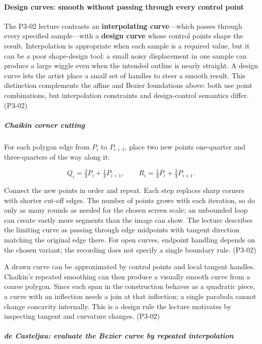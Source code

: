 \paragraph{Design curves: smooth without passing through every control point}\label{design-curves-smooth-without-passing-through-every-control-point}

The P3-02 lecture contrasts an \textbf{interpolating curve}---which passes through every specified sample---with a \textbf{design curve} whose control points shape the result. Interpolation is appropriate when each sample is a required value, but it can be a poor shape-design tool: a small noisy displacement in one sample can produce a large wiggle even when the intended outline is nearly straight. A design curve lets the artist place a small set of handles to steer a smooth result. This distinction complements the affine and Bezier foundations above: both use point combinations, but interpolation constraints and design-control semantics differ. (P3-02)

\subparagraph{Chaikin corner cutting}\label{chaikin-corner-cutting}

For each polygon edge from \(P_i\) to \(P_{i+1}\), place two new points one-quarter and three-quarters of the way along it:

\[
Q_i=\tfrac34P_i+\tfrac14P_{i+1},\qquad
R_i=\tfrac14P_i+\tfrac34P_{i+1}.
\]

Connect the new points in order and repeat. Each step replaces sharp corners with shorter cut-off edges. The number of points grows with each iteration, so do only as many rounds as needed for the chosen screen scale; an unbounded loop can create vastly more segments than the image can show. The lecture describes the limiting curve as passing through edge midpoints with tangent direction matching the original edge there. For open curves, endpoint handling depends on the chosen variant; the recording does not specify a single boundary rule. (P3-02)

A drawn curve can be approximated by control points and local tangent handles. Chaikin's repeated smoothing can then produce a visually smooth curve from a coarse polygon. Since each span in the construction behaves as a quadratic piece, a curve with an inflection needs a join at that inflection; a single parabola cannot change concavity internally. This is a design rule the lecture motivates by inspecting tangent and curvature changes. (P3-02)

\subparagraph{de Casteljau: evaluate the Bezier curve by repeated interpolation}\label{de-casteljau-evaluate-the-bezier-curve-by-repeated-interpolation}

